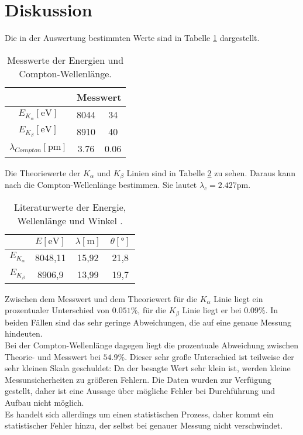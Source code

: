 \section{Diskussion}
\label{sec:Diskussion}

Die in der Auswertung bestimmten Werte sind in Tabelle \ref{tab:mess}
dargestellt. 

\begin{table}
    \centering
    \begin{tabular}{c c @{${}\pm{}$} c}
        \toprule
        & \multicolumn{2}{c}{Messwert} \\
        \midrule
        $E_{K_\alpha} [\text{eV}]$ & 8044 & 34 \\
        $E_{K_\beta} [\text{eV}]$ & 8910 & 40 \\
        $\lambda_{Compton} [\text{pm}]$ & 3.76 & 0.06\\ 
        \bottomrule
    \end{tabular}
    \caption{Messwerte der Energien und Compton-Wellenlänge.}
    \label{tab:mess}
\end{table}
\noindent Die Theoriewerte der $K_\alpha$ und $K_\beta$ Linien sind in Tabelle
\ref{tab:theo} zu sehen. Daraus kann nach %
die Compton-Wellenlänge bestimmen. Sie lautet $\lambda_c = 2.427 \si{\pico\m}$.

\begin{table}
    \centering
    \begin{tabular}{c c c c}
        \toprule
        & $E [\text{eV}]$ & $\lambda [\text{m}]$ & $\theta [°]$\\
        \midrule
        $E_{K_{\alpha}}$ & 8048,11 & 15,92 & 21,8\\
        $E_{K_{\beta}} $ & 8906,9 & 13,99 & 19,7\\
        \bottomrule
    \end{tabular}
    \caption{Literaturwerte der Energie, Wellenlänge und Winkel \cite{theo}.}
    \label{tab:theo}
\end{table}
\noindent Zwischen dem Messwert und dem Theoriewert für die $K_\alpha$ Linie liegt ein prozentualer
Unterschied von $0.051 \%$, für die $K_\beta$ Linie liegt er bei $0.09 \%$.
In beiden Fällen sind das sehr geringe Abweichungen, die auf eine genaue Messung
hindeuten. \\
Bei der Compton-Wellenlänge dagegen liegt die prozentuale Abweichung
zwischen Theorie- und Messwert bei $54.9 \%$. Dieser sehr große Unterschied
ist teilweise der sehr kleinen Skala geschuldet: Da der besagte Wert sehr klein ist,
werden kleine Messunsicherheiten zu größeren Fehlern. Die Daten wurden zur Verfügung 
gestellt, daher ist eine Aussage über mögliche Fehler bei Durchführung und Aufbau nicht
möglich.\\
Es handelt sich allerdings um einen statistischen Prozess, daher kommt ein statistischer Fehler 
hinzu, der selbst bei genauer Messung nicht verschwindet. 

